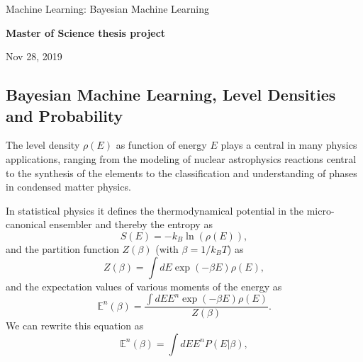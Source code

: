 \documentclass[%
oneside,                 %
final,                   %
10pt]{article}
\begin{document}

\newcommand{\exercisesection}[1]{\subsection*{#1}}






\thispagestyle{empty}

\begin{center}
{\LARGE\bf
\begin{spacing}{1.25}
Machine Learning: Bayesian Machine Learning
\end{spacing}
}
\end{center}


\begin{center}
{\bf Master of Science thesis project${}^{}$} \\ [0mm]
\end{center}

\begin{center}
\end{center}
    

\begin{center}
Nov 28, 2019
\end{center}

\vspace{1cm}


\subsection{Bayesian Machine Learning, Level Densities and Probability}

The level density $\rho(E)$ as function of energy $E$ plays a central in many
physics applications, ranging from the modeling of nuclear
astrophysics reactions central to the synthesis of the elements to the
classification and understanding of phases in condensed matter
physics.

In statistical physics it defines the thermodynamical potential in the micro-canonical ensembler and thereby the entropy as
\[
S(E) = -k_B \ln{(\rho(E))},
\]
and the partition function $Z(\beta)$ (with $\beta = 1/k_BT$)  as
\[
Z(\beta) = \int dE \exp{(-\beta E)}\rho(E),
\]
and the expectation values of various moments of the energy
as
\[
\mathbb{E}^n(\beta) = \frac{\int dE E^n\exp{(-\beta E)}\rho(E)}{Z(\beta)}. 
\]
We can rewrite this equation as
\[
\mathbb{E}^n(\beta) = \int dE E^n P(E\vert\beta), 
\]
\end{document}
